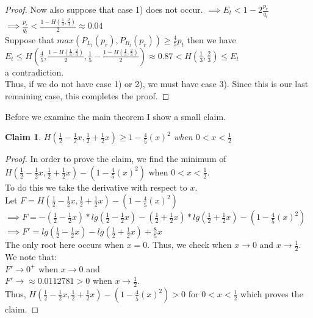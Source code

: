 \documentclass[letterpaper,12pt,titlepage,oneside,final]{book}
\theoremstyle{plain}
\begin{document}
\begin{proof}
Now also suppose that case 1) does not occur. 
$\implies E_t < 1-2\frac{p_r}{q_t}$ \\
$\implies \frac{p_r}{q_t} < \frac{1-H(\frac{1}{3}, \frac{2}{3})}{2} \approx 0.04$ \\
Suppose that $max(P_{L_t}(p_r), P_{R_t}(p_r)) \geq \frac{4}{5} p_t$ then we have \\
$E_t \leq H(\frac{4}{5}, \frac{1-H(\frac{1}{3}, \frac{2}{3})}{2}, \frac{1}{5}-\frac{1-H(\frac{1}{3}, \frac{2}{3})}{2}) \approx 0.87 < H(\frac{1}{3}, \frac{2}{3}) \leq E_t$ \\ 
a contradiction. \\
Thus, if we do not have case 1) or 2), we must have case 3). Since this is our last remaining case, this completes the proof.
 

\end{proof}

Before we examine the main theorem I show a small claim.

\newtheorem{claim}{Claim}
\begin{claim}
$H(\frac{1}{2}-\frac{1}{2} x, \frac{1}{2} + \frac{1}{2} x) \geq 1- \frac{4}{5} (x)^2$ when $0 < x < \frac{1}{2}$
\end{claim}

\begin{proof}
In order to prove the claim, we find the minimum of \\
$H(\frac{1}{2}-\frac{1}{2} x, \frac{1}{2} + \frac{1}{2} x) - (1 - \frac{4}{5} (x)^2)$ when $0 < x < \frac{1}{2}$. \\
To do this we take the derivative with respect to $x$. \\
Let $F= H(\frac{1}{2}-\frac{1}{2} x, \frac{1}{2} + \frac{1}{2} x) - (1 - \frac{4}{5} (x)^2)$ \\
$\implies F = - (\frac{1}{2}-\frac{1}{2} x)* lg(\frac{1}{2}-\frac{1}{2} x) - (\frac{1}{2} + \frac{1}{2} x)*lg(\frac{1}{2} + \frac{1}{2} x) - (1 - \frac{4}{5} (x)^2)$ \\
$\implies F' = lg(\frac{1}{2}-\frac{1}{2} x) - lg(\frac{1}{2} + \frac{1}{2} x) + \frac{8}{5}x$ \\ 
The only root here occurs when $x = 0$. Thus, we check when $x \rightarrow 0$ and $x \rightarrow \frac{1}{2}$. We note that: \\
$F' \rightarrow 0^{+}$ when $x \rightarrow 0$ and \\
$F' \rightarrow \approx 0.0112781 > 0$ when $x \rightarrow \frac{1}{2}$. \\
Thus, $H(\frac{1}{2}-\frac{1}{2} x, \frac{1}{2} + \frac{1}{2} x) - (1 - \frac{4}{5} (x)^2) > 0$ for $ 0 < x < \frac{1}{2}$ which proves the claim.
\end{proof} 
\end{document}
